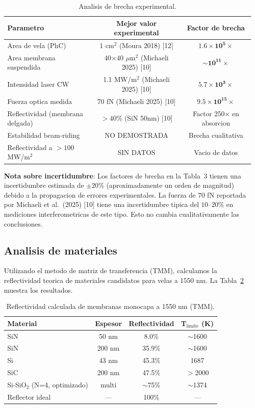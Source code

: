\documentclass[11pt,a4paper,onecolumn]{article}
\begin{document}
\begin{table}[h]
\centering
\caption{Analisis de brecha experimental.}
\label{tab:brecha}
\begin{tabular}{lcc}
\hline
\textbf{Parametro} & \textbf{Mejor valor experimental} & \textbf{Factor de brecha} \\
\hline
Area de vela (PhC) & 1 cm$^2$ (Moura 2018) [12] & $\mathbf{1.6\times10^5\times}$ \\
Area membrana suspendida & 40$\times$40 $\mu$m$^2$ (Michaeli 2025) [10] & $\mathbf{\sim10^{11}\times}$ \\
Intensidad laser CW & 1.1 MW/m$^2$ (Michaeli 2025) [10] & $\mathbf{5.7\times10^3\times}$ \\
Fuerza optica medida & 70 fN (Michaeli 2025) [10] & $\mathbf{9.5\times10^{15}\times}$ \\
Reflectividad (membrana delgada) & $>40\%$ (SiN 50nm) [10] & Factor 250$\times$ en absorcion \\
Estabilidad beam-riding & NO DEMOSTRADA & Brecha cualitativa \\
Reflectividad a $>100$ MW/m$^2$ & SIN DATOS & Vacio de datos \\
\hline
\end{tabular}
\end{table}

\textbf{Nota sobre incertidumbre}: Los factores de brecha en la Tabla~3 tienen una incertidumbre estimada de $\pm20\%$ (aproximadamente un orden de magnitud) debido a la propagacion de errores experimentales. La fuerza de $70$ fN reportada por Michaeli et al.\ (2025) [10] tiene una incertidumbre tipica del $10$--$20\%$ en mediciones interferometricas de este tipo. Esto no cambia cualitativamente las conclusiones.

\subsection{Analisis de materiales}

Utilizando el metodo de matriz de transferencia (TMM), calculamos la reflectividad teorica de materiales candidatos para velas a 1550 nm. La Tabla~\ref{tab:materiales} muestra los resultados.

\begin{table}[h]
\centering
\caption{Reflectividad calculada de membranas monocapa a 1550 nm (TMM).}
\label{tab:materiales}
\begin{tabular}{lccc}
\hline
\textbf{Material} & \textbf{Espesor} & \textbf{Reflectividad} & \textbf{T$_{\text{limite}}$ (K)} \\
\hline
SiN & 50 nm & 8.0\% & $\sim$1600 \\
SiN & 200 nm & 35.9\% & $\sim$1600 \\
Si & 43 nm & 45.3\% & 1687 \\
SiC & 200 nm & 47.5\% & $>$2000 \\
Si-SiO$_2$ (N=4, optimizado) & multi & $\sim$75\% & $\sim$1374 \\
Reflector ideal & --- & 100\% & --- \\
\hline
\end{tabular}
\end{table}
\end{document}
